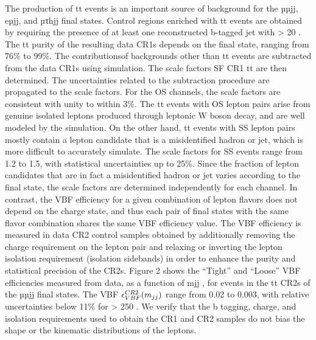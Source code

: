 The production of tt events is an important source of background for the µµjj, eµjj, and µτhjj final states. Control regions enriched with tt events are obtained by requiring the presence of at least one reconstructed b-tagged jet with \pt > 20 \gev. The tt purity of the resulting data CR1s depends on the final state, ranging from 76\% to 99\%. The contributionsof backgrounds other than tt events are subtracted from the data CR1s using simulation. The scale factors SF CR1 tt are then determined. The uncertainties related to the subtraction procedure are propagated to the scale factors. For the OS channels, the scale factors are consistent with unity to within 3\%. The tt events with OS lepton pairs arise from genuine isolated leptons produced through leptonic W boson decay, and are well modeled by the simulation. On the other hand, tt events with SS lepton pairs mostly contain a lepton candidate that is a misidentified hadron or jet, which is more difficult to accurately simulate. The scale factors for SS events range from 1.2 to 1.5, with statistical uncertainties up to 25\%. Since the fraction of lepton candidates that are in fact a misidentified hadron or jet varies according to the final state, the scale factors are determined independently for each channel.
In contrast, the VBF efficiency for a given combination of lepton flavors does not depend on the charge state, and thus each pair of final states with the same flavor combination shares the same VBF efficiency value. The VBF efficiency is measured in data CR2 control samples obtained by additionally removing the charge requirement on the lepton pair and relaxing or inverting the lepton isolation requirement (isolation
sidebands) in order to enhance the purity and statistical precision of the CR2s. Figure 2 shows the “Tight” and “Loose” VBF efficiencies measured from data, as a function of mjj , for events in the tt CR2s of the µµjj final states. The VBF $\epsilon^{CR2}_{VBF}(m_{jj})$ range from 0.02 to 0.003, with relative uncertainties below 11\% for \mjj > 250 \gev. We verify that the b tagging, charge, and isolation requirements used to obtain the CR1 and CR2 samples do not bias the \mjj shape or the kinematic distributions of the leptons.

